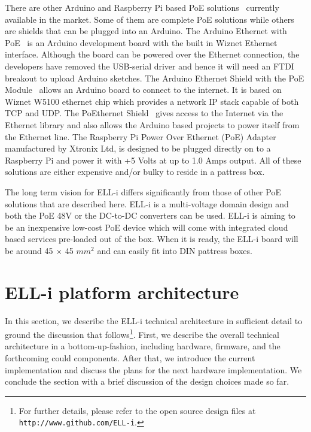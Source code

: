 \documentclass[draft,a4paper]{siamltex}
\begin{document}
There are other Arduino and Raspberry Pi based PoE
solutions~\cite{ArduinoEthernetPOE} \cite{ArduinoEthernetShieldPOE}
\cite{POEthernetShield} \cite{etherduino} \cite{xtronix} currently available in
the market. Some of them are complete PoE solutions while others are shields
that can be plugged into an Arduino. The Arduino Ethernet with
PoE~\cite{ArduinoEthernetPOE} is an Arduino development board with the built in
Wiznet Ethernet interface. Although the board can be powered over the Ethernet
connection, the developers have removed the USB-serial driver and hence it will
need an FTDI breakout to upload Arduino sketches. The Arduino Ethernet Shield
with the PoE Module~\cite{ArduinoEthernetShieldPOE} allows an Arduino board to
connect to the internet. It is based on Wiznet W5100 ethernet chip which
provides a network IP stack capable of both TCP and UDP. The PoEthernet
Shield~\cite{POEthernetShield} gives access to the Internet via the Ethernet
library and also allows the Arduino based projects to power itself from the
Ethernet line. The Raspberry Pi Power Over Ethernet (PoE) Adapter~\cite{xtronix}
manufactured by Xtronix Ltd, is designed to be plugged directly on to a
Raspberry Pi and power it with +5 Volts at up to 1.0 Amps output. All of these
solutions are either expensive and/or bulky to reside in a pattress box.

The long term vision for ELL-i differs significantly from those of other PoE
solutions that are described here. ELL-i is a multi-voltage domain design and
both the PoE 48V or the DC-to-DC converters can be used. ELL-i is aiming to be
an inexpensive low-cost PoE device which will come with integrated cloud based
services pre-loaded out of the box. When it is ready, the ELL-i board will be
around 45 $\times$ 45 $mm^2$ and can easily fit into DIN pattress boxes. 



\section{ELL-i platform architecture}
\label{sec:architecture}

In this section, we describe the ELL-i technical architecture in
sufficient detail to ground the discussion that follows\footnote{For further
details, please refer to the open source design files at
\hbox{\tt http://www.github.com/ELL-i}.}.
First, we describe the overall technical architecture in a
bottom-up-fashion, including hardware, firmware, and the forthcoming
could components.  After that, we introduce the current
implementation and discuss the plans for the next hardware implementation.  We
conclude the section with a brief discussion of the design choices
made so far.
\end{document}
